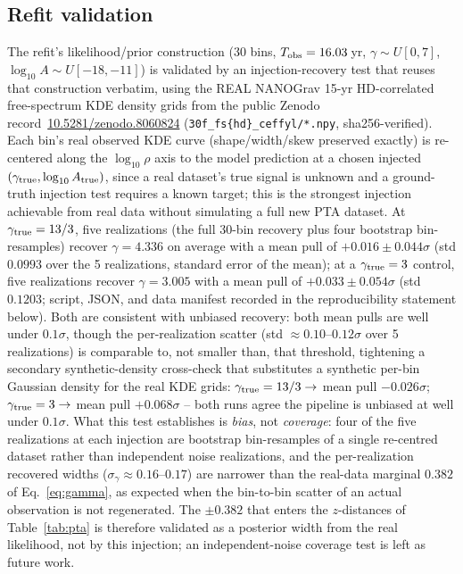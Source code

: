 \documentclass[aps,prd,twocolumn,superscriptaddress,nofootinbib,longbibliography]{revtex4-2}
\begin{document}
\subsection{Refit validation}
\label{sec:pta_validity}

The refit's likelihood/prior construction (30 bins, $T_{\rm obs}=16.03$\,yr,
$\gamma\sim U[0,7]$, $\log_{10}A\sim U[-18,-11]$) is validated by an
injection-recovery test that reuses that construction verbatim, using the
REAL NANOGrav 15-yr HD-correlated free-spectrum KDE density grids from the
public Zenodo record\allowbreak\
\href{https://doi.org/10.5281/zenodo.8060824}{10.5281/zenodo.8060824}
(\texttt{30f\_fs\{hd\}\_ceffyl/*.npy}, sha256-verified). Each bin's real
observed KDE curve (shape/width/skew preserved exactly) is re-centered along
the $\log_{10}\rho$ axis to the model prediction at a chosen injected
$(\gamma_{\rm true},\log_{10}A_{\rm true})$, since a real dataset's true
signal is unknown and a ground-truth injection test requires a known
target; this is the strongest injection achievable from real data without
simulating a full new PTA dataset. At $\gamma_{\rm true}=13/3$, five
realizations (the full 30-bin recovery plus four bootstrap bin-resamples)
recover $\gamma=4.336$ on average with a mean pull of $+0.016\pm0.044\sigma$
(std $0.0993$ over the 5 realizations, standard error of the mean); at a
$\gamma_{\rm true}=3$ control, five realizations recover $\gamma=3.005$ with
a mean pull of $+0.033\pm0.054\sigma$ (std $0.1203$; script, JSON, and data manifest
recorded in the reproducibility statement below). Both
are consistent with unbiased recovery: both mean pulls are well under
$0.1\sigma$, though the per-realization scatter (std $\approx0.10$--$0.12\sigma$
over 5 realizations) is comparable to, not smaller than, that threshold,
tightening a secondary synthetic-density cross-check that substitutes a
synthetic per-bin Gaussian density for the real KDE grids: $\gamma_{\rm
true}=13/3\to$ mean pull $-0.026\sigma$; $\gamma_{\rm true}=3\to$ mean pull
$+0.068\sigma$ -- both runs
agree the pipeline is unbiased at well under $0.1\sigma$. What this test
establishes is \emph{bias}, not \emph{coverage}: four of the five
realizations at each injection are bootstrap bin-resamples of a single
re-centred dataset rather than independent noise realizations, and the
per-realization recovered widths ($\sigma_\gamma\approx0.16$--$0.17$) are
narrower than the real-data marginal $0.382$ of Eq.~\eqref{eq:gamma},
as expected when the bin-to-bin scatter of an actual observation is not
regenerated. The $\pm0.382$ that enters the $z$-distances of
Table~\ref{tab:pta} is therefore validated as a posterior width from the
real likelihood, not by this injection; an independent-noise coverage
test is left as future work.
\end{document}
